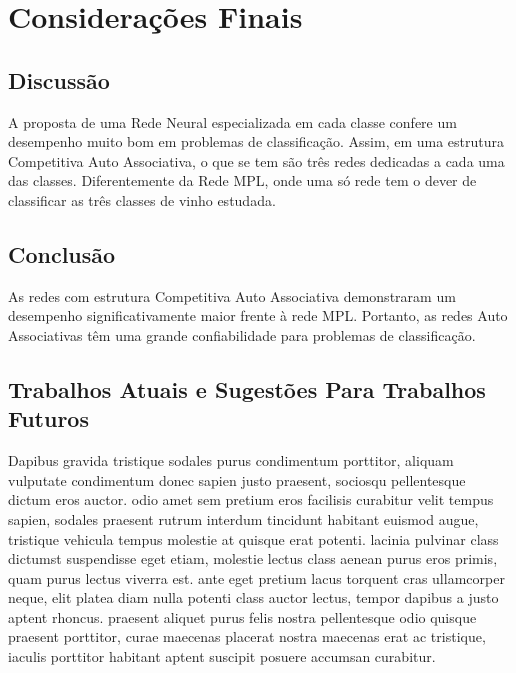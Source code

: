\section{Considerações Finais}

\subsection{Discussão}

A proposta de uma Rede Neural especializada em cada classe confere um desempenho muito bom em problemas de classificação. Assim, em uma estrutura Competitiva Auto Associativa, o que se tem são três redes dedicadas a cada uma das classes. Diferentemente da Rede MPL, onde uma só rede tem o dever de classificar as três classes de vinho estudada.


\subsection{Conclusão}

As redes com estrutura Competitiva Auto Associativa demonstraram um desempenho significativamente maior frente à rede MPL. Portanto, as redes Auto Associativas têm uma grande confiabilidade para problemas de classificação.


\subsection{Trabalhos Atuais e Sugestões Para Trabalhos Futuros}

Dapibus gravida tristique sodales purus condimentum porttitor, aliquam vulputate condimentum donec sapien justo praesent, sociosqu pellentesque dictum eros auctor. odio amet sem pretium eros facilisis curabitur velit tempus sapien, sodales praesent rutrum interdum tincidunt habitant euismod augue, tristique vehicula tempus molestie at quisque erat potenti. lacinia pulvinar class dictumst suspendisse eget etiam, molestie lectus class aenean purus eros primis, quam purus lectus viverra est. ante eget pretium lacus torquent cras ullamcorper neque, elit platea diam nulla potenti class auctor lectus, tempor dapibus a justo aptent rhoncus. praesent aliquet purus felis nostra pellentesque odio quisque praesent porttitor, curae maecenas placerat nostra maecenas erat ac tristique, iaculis porttitor habitant aptent suscipit posuere accumsan curabitur. 